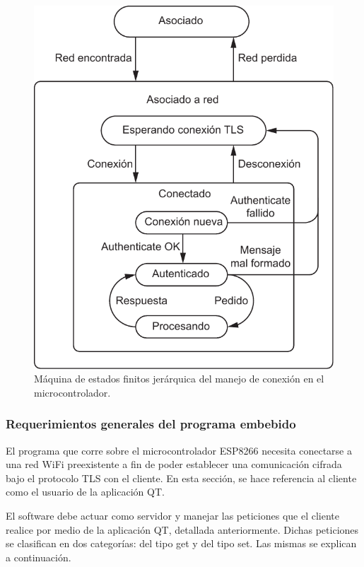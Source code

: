 \begin{figure}[ht!]
	\begin{center}
		\centering
		\includegraphics[scale=0.8]{imagenes/fsm-micro.pdf}
		\caption{Máquina de estados finitos jerárquica del manejo de conexión en el microcontrolador.}
		\label{fig:fsm-micro}
	\end{center}
\end{figure}



\subsubsection{Requerimientos generales del programa embebido}

El programa que corre sobre el microcontrolador ESP8266 necesita conectarse a una red WiFi preexistente a fin de poder establecer una comunicación cifrada bajo el protocolo TLS con el cliente.
En esta sección, se hace referencia al cliente como el usuario de la aplicación QT.

El software debe actuar como servidor y manejar las peticiones que el cliente realice por medio de la aplicación QT, detallada anteriormente.
Dichas peticiones se clasifican en dos categorías: del tipo get y del tipo set. Las mismas se explican a continuación.

